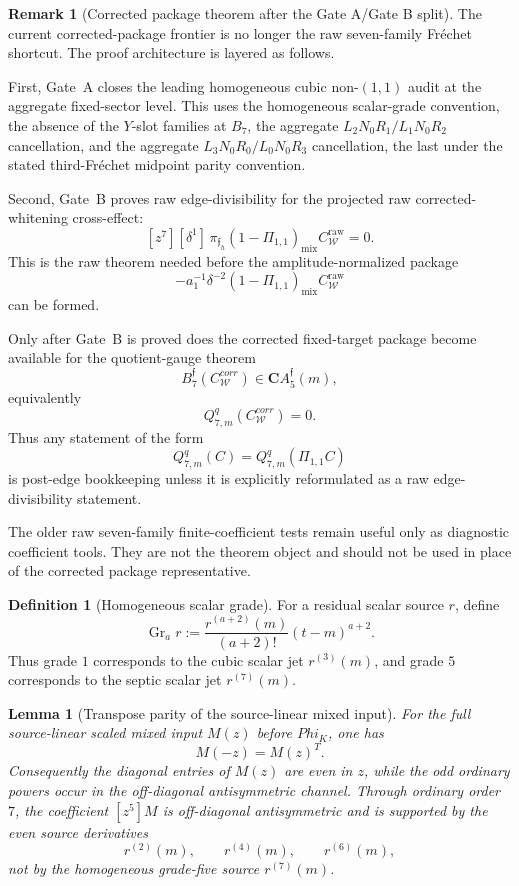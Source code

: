 \documentclass[11pt,a4paper]{amsart}
\def\Phi{Phi}%
\def\corr{corr}%
\theoremstyle{plain}
\newtheorem{lemma}[theorem]{Lemma}
\theoremstyle{definition}
\newtheorem{definition}[theorem]{Definition}
\newtheorem{remark}[theorem]{Remark}
\newcommand{\corr}{\mathrm{corr}}
\begin{document}
\begin{remark}[Corrected package theorem after the Gate A/Gate B split]
\label{rem:wip-first-cubic-source-transfer-target}
The current corrected-package frontier is no longer the raw seven-family
Fr\'echet shortcut.  The proof architecture is layered as follows.

First, Gate~A closes the leading homogeneous cubic non-\((1,1)\) audit at
the aggregate fixed-sector level.  This uses the homogeneous scalar-grade
convention, the absence of the \(Y\)-slot families at \(B_7\), the aggregate
\(L_2N_0R_1/L_1N_0R_2\) cancellation, and the aggregate
\(L_3N_0R_0/L_0N_0R_3\) cancellation, the last under the stated
third-Fr\'echet midpoint parity convention.

Second, Gate~B proves raw edge-divisibility for the projected raw
corrected-whitening cross-effect:
\[
[z^7][\delta^1]\,
\pi_{\mathfrak f_h}
(1-\Pi_{1,1})_{\mathrm{mix}}C_{\mathcal W}^{\mathrm{raw}}=0.
\]
This is the raw theorem needed before the amplitude-normalized package
\[
-a_1^{-1}\delta^{-2}
(1-\Pi_{1,1})_{\mathrm{mix}}C_{\mathcal W}^{\mathrm{raw}}
\]
can be formed.

Only after Gate~B is proved does the corrected fixed-target package become
available for the quotient-gauge theorem
\[
B_7^{\mathfrak f}(C_{\mathcal W}^{\corr})
\in
\mathbf C A_5^{\mathfrak f}(m),
\]
equivalently
\[
Q_{7,m}^q(C_{\mathcal W}^{\corr})=0.
\]
Thus any statement of the form
\[
Q_{7,m}^q(C)=Q_{7,m}^q(\Pi_{1,1}C)
\]
is post-edge bookkeeping unless it is explicitly reformulated as a raw
edge-divisibility statement.

The older raw seven-family finite-coefficient tests remain useful only as
diagnostic coefficient tools.  They are not the theorem object and should
not be used in place of the corrected package representative.
\end{remark}

\begin{definition}[Homogeneous scalar grade]
\label{def:homogeneous-scalar-grade}
For a residual scalar source \(r\), define
\[
\operatorname{Gr}_a r
:=
\frac{r^{(a+2)}(m)}{(a+2)!}(t-m)^{a+2}.
\]
Thus grade \(1\) corresponds to the cubic scalar jet \(r^{(3)}(m)\), and
grade \(5\) corresponds to the septic scalar jet \(r^{(7)}(m)\).
\end{definition}

\begin{lemma}[Transpose parity of the source-linear mixed input]
\label{lem:transpose-parity-source-linear-mixed-input}
For the full source-linear scaled mixed input \(M(z)\) before \(\Phi_K\), one
has
\[
M(-z)=M(z)^T.
\]
Consequently the diagonal entries of \(M(z)\) are even in \(z\), while the
odd ordinary powers occur in the off-diagonal antisymmetric channel.  Through
ordinary order \(7\), the coefficient \([z^5]M\) is off-diagonal
antisymmetric and is supported by the even source derivatives
\[
r^{(2)}(m),\qquad r^{(4)}(m),\qquad r^{(6)}(m),
\]
not by the homogeneous grade-five source \(r^{(7)}(m)\).
\end{lemma}
\end{document}
